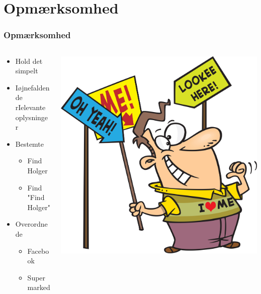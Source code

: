 \documentclass{beamer}
\begin{document}
\section{Opmærksomhed}
\begin{frame}
\frametitle{Opmærksomhed}
  \begin{columns}[T]
    \begin{column}{.5\textwidth}
	  \begin{itemize}
		\item Hold det simpelt
		\item Iøjnefaldende rIelevante oplysninger
	    \item Bestemte
	    \begin{itemize}
	      \item Find Holger
	      \item Find "Find Holger"
	    \end{itemize}
	    \item Overordnede
	    \begin{itemize}
	      \item Facebook
	      \item Supermarked
	    \end{itemize}
	  \end{itemize}
    \end{column}
    \begin{column}{.5\textwidth}
      \includegraphics[width=\textwidth]{me.jpg}
    \end{column}
  \end{columns}
\end{frame}
\end{document}
